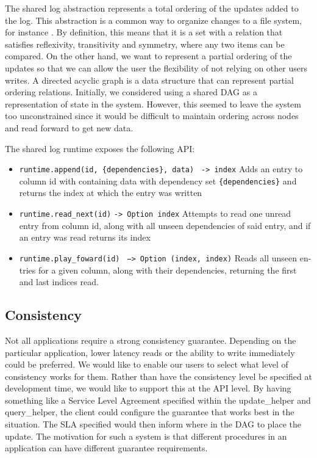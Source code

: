 \documentclass[letterpaper,twocolumn,10pt]{article}
\begin{document}
The shared log abstraction represents a total ordering of the updates added to the log. This abstraction is a common way to organize changes to a file system, for instance \cite{Log}. By definition, this means that it is a set with a relation that satisfies reflexivity, transitivity and symmetry, where any two items can be compared. On the other hand, we want to represent a partial ordering of the updates so that we can allow the user the flexibility of not relying on other users writes. A directed acyclic graph is a data structure that can represent partial ordering relations. Initially, we considered using a shared DAG as a representation of state in the system. However, this seemed to leave the system too unconstrained since it would be difficult to maintain ordering across nodes and read forward to get new data. 

The shared log runtime exposes the following API:

\begin{itemize}

\item \verb_runtime.append(id, {dependencies}, data)_ \verb_ -> index_ Adds an entry to column id with containing data with dependency set \verb_{dependencies}_ and returns the index at which the entry was written

\item \verb~runtime.read_next(id)~ \verb~-> Option index~ Attempts to read one unread entry from column id, along with all unseen dependencies of said entry, and if an entry was read returns its index

\item \verb~runtime.play_foward(id)~ \verb~ −> Option (index, index)~ Reads all unseen en- tries for a given column, along with their dependencies, returning the first and last indices read.

\end{itemize}


\subsection{Consistency}

Not all applications require a strong consistency guarantee. Depending on the particular application, lower latency reads or the ability to write immediately could be preferred. We would like to enable our users to select what level of consistency works for them. Rather than have the consistency level be specified at development time, we would like to support this at the API level. By having something like a Service Level Agreement specified within the update\_helper and query\_helper, the client could configure the guarantee that works best in the situation. The SLA specified would then inform where in the DAG to place the update. The motivation for such a system is that different procedures in an application can have different guarantee requirements.
\end{document}

